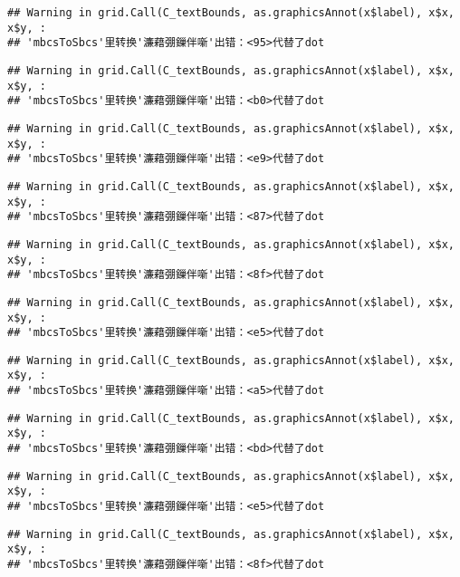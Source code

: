 \documentclass[]{article}
\begin{document}
\begin{verbatim}
## Warning in grid.Call(C_textBounds, as.graphicsAnnot(x$label), x$x, x$y, :
## 'mbcsToSbcs'里转换'濂藉弸鏁伴噺'出错：<95>代替了dot
\end{verbatim}

\begin{verbatim}
## Warning in grid.Call(C_textBounds, as.graphicsAnnot(x$label), x$x, x$y, :
## 'mbcsToSbcs'里转换'濂藉弸鏁伴噺'出错：<b0>代替了dot
\end{verbatim}

\begin{verbatim}
## Warning in grid.Call(C_textBounds, as.graphicsAnnot(x$label), x$x, x$y, :
## 'mbcsToSbcs'里转换'濂藉弸鏁伴噺'出错：<e9>代替了dot
\end{verbatim}

\begin{verbatim}
## Warning in grid.Call(C_textBounds, as.graphicsAnnot(x$label), x$x, x$y, :
## 'mbcsToSbcs'里转换'濂藉弸鏁伴噺'出错：<87>代替了dot
\end{verbatim}

\begin{verbatim}
## Warning in grid.Call(C_textBounds, as.graphicsAnnot(x$label), x$x, x$y, :
## 'mbcsToSbcs'里转换'濂藉弸鏁伴噺'出错：<8f>代替了dot
\end{verbatim}

\begin{verbatim}
## Warning in grid.Call(C_textBounds, as.graphicsAnnot(x$label), x$x, x$y, :
## 'mbcsToSbcs'里转换'濂藉弸鏁伴噺'出错：<e5>代替了dot
\end{verbatim}

\begin{verbatim}
## Warning in grid.Call(C_textBounds, as.graphicsAnnot(x$label), x$x, x$y, :
## 'mbcsToSbcs'里转换'濂藉弸鏁伴噺'出错：<a5>代替了dot
\end{verbatim}

\begin{verbatim}
## Warning in grid.Call(C_textBounds, as.graphicsAnnot(x$label), x$x, x$y, :
## 'mbcsToSbcs'里转换'濂藉弸鏁伴噺'出错：<bd>代替了dot
\end{verbatim}

\begin{verbatim}
## Warning in grid.Call(C_textBounds, as.graphicsAnnot(x$label), x$x, x$y, :
## 'mbcsToSbcs'里转换'濂藉弸鏁伴噺'出错：<e5>代替了dot
\end{verbatim}

\begin{verbatim}
## Warning in grid.Call(C_textBounds, as.graphicsAnnot(x$label), x$x, x$y, :
## 'mbcsToSbcs'里转换'濂藉弸鏁伴噺'出错：<8f>代替了dot
\end{verbatim}
\end{document}
